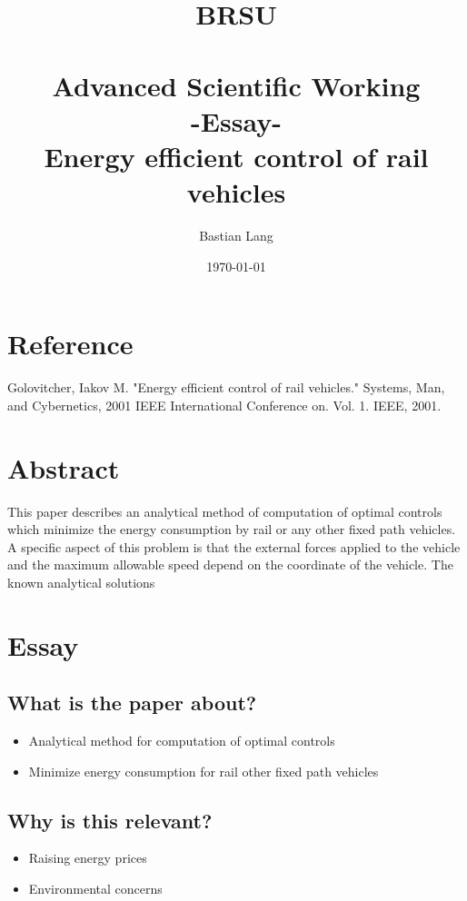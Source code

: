 \documentclass[paper=a4, fontsize=11pt]{scrartcl} %
\title{	
\normalfont \normalsize 
\textsc{BRSU} \\ [25pt] %
\horrule{0.5pt} \\[0.4cm] %
\huge Advanced Scientific Working\\-Essay-\\
Energy efficient control of rail vehicles %
\horrule{2pt} \\[0.5cm] %
}
\author{Bastian Lang} %
\date{\normalsize\today} %
\numberwithin{equation}{section} %
\numberwithin{figure}{section} %
\numberwithin{table}{section} %
\begin{document}
\maketitle %

\newpage

\section{Reference}
Golovitcher, Iakov M. "Energy efficient control of rail vehicles." Systems, Man, and Cybernetics, 2001 IEEE International Conference on. Vol. 1. IEEE, 2001.

\section{Abstract}

This paper describes an analytical method of computation of optimal controls which minimize the energy consumption by rail or any other fixed path vehicles. A specific aspect of this problem is that the external forces applied to the vehicle and the maximum allowable speed depend on the coordinate of the vehicle. The known analytical solutions


\section{Essay}
\subsection{What is the paper about?}
\begin{itemize}
	\item Analytical method for computation of optimal controls
	\item Minimize energy consumption for rail other fixed path vehicles
	
\end{itemize}

\subsection{Why is this relevant?}
\begin{itemize}
	\item Raising energy prices
	\item Environmental concerns
\end{itemize}
\end{document}
